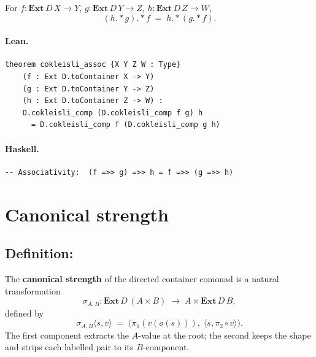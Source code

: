 \documentclass[11pt,a4paper]{article}
\begin{document}
\begin{thm}
For $f : \mathbf{Ext}\,D\,X \to Y$, $g : \mathbf{Ext}\,D\,Y \to Z$,
$h : \mathbf{Ext}\,D\,Z \to W$,
\[
  (h \mathbin{.*} g) \mathbin{.*} f \;=\; h \mathbin{.*} (g \mathbin{.*} f).
\]
\end{thm}

\paragraph{Lean.}
\begin{lstlisting}[style=lean]
theorem cokleisli_assoc {X Y Z W : Type}
    (f : Ext D.toContainer X -> Y)
    (g : Ext D.toContainer Y -> Z)
    (h : Ext D.toContainer Z -> W) :
    D.cokleisli_comp (D.cokleisli_comp f g) h
      = D.cokleisli_comp f (D.cokleisli_comp g h)
\end{lstlisting}

\paragraph{Haskell.}
\begin{lstlisting}[style=haskell]
-- Associativity:  (f =>> g) =>> h = f =>> (g =>> h)
\end{lstlisting}


\section{Canonical strength}

\subsection{Definition: }

\begin{defn}
The \textbf{canonical strength} of the directed container comonad is a natural
transformation
\[
  \sigma_{A,B} : \mathbf{Ext}\,D\,(A \times B) \;\longrightarrow\;
                 A \times \mathbf{Ext}\,D\,B,
\]
defined by
\[
  \sigma_{A,B}\langle s, v \rangle
  \;=\;
  \bigl(\pi_1(v(o(s))),\;
        \langle s, \pi_2 \circ v \rangle\bigr).
\]
The first component extracts the $A$-value at the root; the second keeps the
shape and strips each labelled pair to its $B$-component.
\end{defn}
\end{document}

